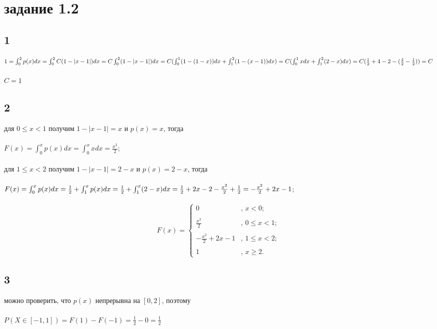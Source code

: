 \documentclass[a4paper]{article}
\begin{document}
	\section*{задание 1.2}
	\begin{large}
		\subsection*{1}
		$1=\int_{0}^{2}p(x)dx=\int_{0}^{2}C(1-|x-1|)dx=C\int_{0}^{2}(1-|x-1|)dx=\\
		\\
		C(\int_{0}^{1}(1-(1-x))dx+\int_{1}^{2}(1-(x-1))dx)=\\
		\\
		C(\int_{0}^{1}xdx+\int_{1}^{2}(2-x)dx)=C(\frac{1}{2}+4-2-(\frac{4}{2}-\frac{1}{2}))=C$\\
		\\
		$C=1$
		\subsection*{2}
		для $0\le x<1$ получим $1-|x-1|=x$ и $p(x)=x$, тогда\\
		\\
		$F(x)=\int_{0}^{x}p(x)dx=\int_{0}^{x}xdx=\frac{x^2}{2}$;\\
		\\
		для $1 \le x < 2$ получим $1-|x-1|=2-x$ и $p(x)=2-x$, тогда\\
		\\
		$F(x)=\int_{0}^{x}p(x)dx=\frac{1}{2}+\int_{1}^{x}p(x)dx=\frac{1}{2}+\int_{1}^{x}(2-x)dx=\\
		\\
		\frac{1}{2}+2x-2-\frac{x^2}{2}+\frac{1}{2}=-\frac{x^2}{2}+2x-1$;\\
		\\
		\[ F(x) = \left\{ \begin{array}{ll}
			0 & \mbox{, $x<0$};\\
			\\
			\frac{x^2}{2} & \mbox{, $0\le x<1$};\\
			\\
			-\frac{x^2}{2}+2x-1 & \mbox{, $1 \le x < 2$};\\
			\\
			1 & \mbox{, $x \ge 2$}.\end{array} \right. \]
		\subsection*{3}
		можно проверить, что $p(x)$ непрерывна на $[0,2]$, поэтому\\
		\\
		$P(X \in [-1,1])=F(1)-F(-1)=\frac{1}{2}-0=\frac{1}{2}$

\end{large}
\end{document}
